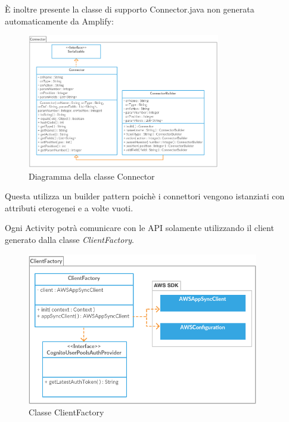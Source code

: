 È inoltre presente la classe di supporto Connector.java non generata automaticamente da Amplify:
        \begin{figure}[H]
	    \begin{center}
		\includegraphics[width=0.75\textwidth, keepaspectratio]{../includes/pics/connector.png}
		\caption{Diagramma della classe Connector}
	    \end{center}
        \end{figure}
        
Questa utilizza un builder pattern poichè i connettori vengono istanziati con attributi eterogenei e a volte vuoti.        

Ogni Activity potrà comunicare con le API solamente utilizzando il client generato dalla classe \emph{ClientFactory}.\\[0.25cm]

\begin{figure}[H]
	\begin{center}
		\includegraphics[width=0.9\textwidth, keepaspectratio]{../includes/pics/clientfactory.png}
		\caption{Classe ClientFactory}
	\end{center}
\end{figure}

